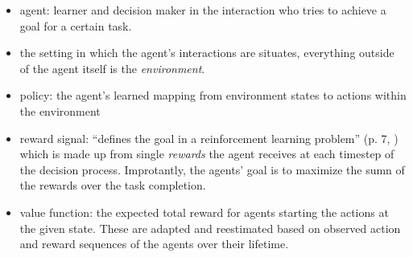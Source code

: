 \begin{itemize}
	\item agent: learner and decision maker in the interaction who tries to achieve a goal for a certain task.
	\item the setting in which the agent's interactions are situates, everything outside of the agent itself is the \textit{environment}.
	\item policy: the agent's learned mapping from environment states to actions within the environment 
	\item reward signal: ``defines the goal in a reinforcement learning problem'' (p. 7, \cite{sutton2018reinforcement}) which is made up from single \textit{rewards} the agent receives at each timestep of the decision process. Improtantly, the agents' goal is to maximize the sumn of the rewards over the task completion.
	\item value function: the expected total reward for agents starting the actions at the given state. These are adapted and reestimated based on observed action and reward sequences of the agents over their lifetime. 
\end{itemize}

